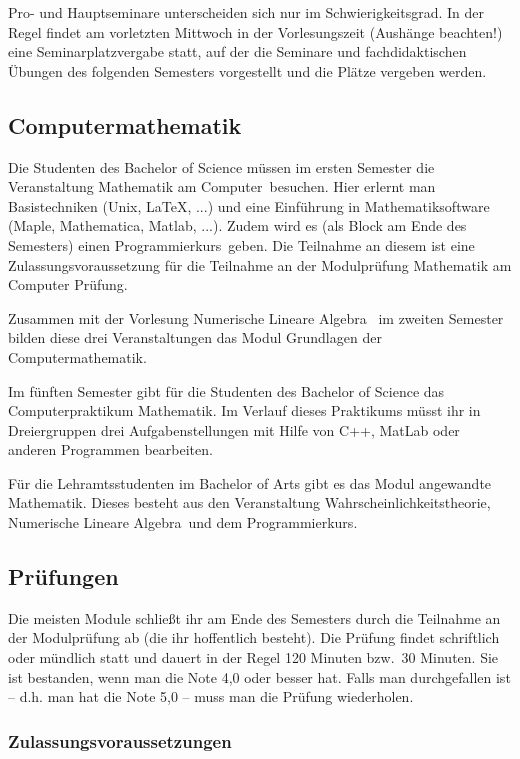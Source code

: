 Pro- und Hauptseminare unterscheiden sich nur im Schwierigkeitsgrad. 
In der Regel findet am vorletzten Mittwoch
in der Vorlesungszeit (Aushänge beachten!)  eine Seminarplatzvergabe statt,
auf der die Seminare und fachdidaktischen Übungen des folgenden
Semesters vorgestellt und die Plätze vergeben werden.

\subsection{Computermathematik}

Die Studenten des Bachelor of Science
müssen im ersten Semester die Veranstaltung
\glqq Mathematik am Computer\grqq~besuchen.
Hier erlernt man Basistechniken (Unix, \LaTeX, ...)
und eine Einführung in Mathematiksoftware (Maple, Mathematica, Matlab, ...).
Zudem wird es (als Block am Ende des Semesters)
einen \glqq Programmierkurs\grqq\ geben.
Die Teilnahme an diesem ist eine Zulassungsvoraussetzung
für die Teilnahme an der Modulprüfung Mathematik am Computer Prüfung.

Zusammen mit der Vorlesung \glqq Numerische Lineare Algebra\grqq
~im zweiten Semester bilden diese drei Veranstaltungen das Modul
\glqq Grundlagen der Computermathematik\grqq.

Im fünften Semester gibt für die Studenten
des Bachelor of Science das \glqq Computerpraktikum Mathematik\grqq.
Im Verlauf dieses Praktikums müsst ihr in Dreiergruppen
drei Aufgabenstellungen mit Hilfe
von C++, MatLab oder anderen Programmen bearbeiten.

Für die Lehramtsstudenten im Bachelor of Arts
gibt es das Modul angewandte Mathematik.
Dieses besteht aus den Veranstaltung \glqq Wahrscheinlichkeitstheorie\grqq,
\glqq Numerische Lineare Algebra\grqq\ und dem \glqq Programmierkurs\grqq.

\subsection{Prüfungen}

Die meisten Module schließt ihr am Ende
des Semesters durch die Teilnahme
an der Modulprüfung ab (die ihr hoffentlich besteht).
Die Prüfung findet schriftlich oder mündlich statt
und dauert in der Regel 120 Minuten bzw.\ 30 Minuten.
Sie ist bestanden, wenn man die Note 4,0 oder besser hat.
Falls man durchgefallen ist -- d.h. man hat die Note 5,0 --
muss man die Prüfung wiederholen.

\subsubsection{Zulassungsvoraussetzungen}\label{sssec:zu}

